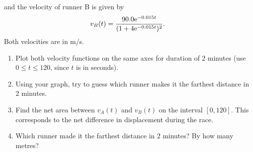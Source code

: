 \begin{enumerate}
    and the velocity of runner B is given by
    \[ v_B(t) = \frac{90.0 {\rm e}^{-0.015t}}{(1 + 4{\rm e}^{-0.015t})^2}.\]
    Both velocities are in m/s.
    \begin{enumerate}
        \item Plot both velocity functions on the same axes for duration of $2$ minutes (use $0 \leq t \leq 120$, since $t$ is in seconds).
        \item Using your graph, try to guess which runner makes it the farthest distance in $2$ minutes.
        \item Find the net area between $v_A(t)$ and $v_B(t)$ on the interval $[0,120]$. This corresponds to the net difference in displacement during the race.
        \item Which runner made it the farthest distance in $2$ minutes? By how many metres?
    \end{enumerate}
\end{enumerate}
